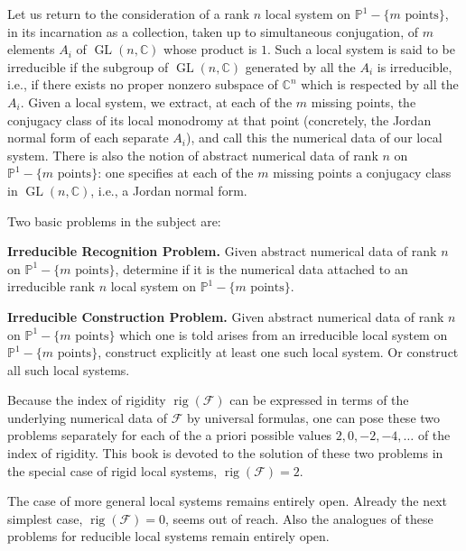 Let us return to the consideration of a rank \(n\) local system on
\(\mathbb{P}^1-\{m\text{ points}\}\), in its incarnation as a collection,
taken up to simultaneous conjugation, of \(m\) elements \(A_i\) of
\(\operatorname{GL}(n,\mathbb{C})\) whose product is \(1\). Such a local
system is said to be irreducible if the subgroup of
\(\operatorname{GL}(n,\mathbb{C})\) generated by all the \(A_i\) is
irreducible, i.e., if there exists no proper nonzero subspace of
\(\mathbb{C}^n\) which is respected by all the \(A_i\). Given a local
system, we extract, at each of the \(m\) missing points, the conjugacy class
of its local monodromy at that point (concretely, the Jordan normal form
of each separate \(A_i\)), and call this the numerical data of our local
system. There is also the notion of abstract numerical data of rank \(n\)
on \(\mathbb{P}^1-\{m\text{ points}\}\): one specifies at each of the
\(m\) missing points a conjugacy class in
\(\operatorname{GL}(n,\mathbb{C})\), i.e., a Jordan normal form.

Two basic problems in the subject are:

\noindent\textbf{Irreducible Recognition Problem.}\quad
Given abstract numerical data of rank \(n\) on
\(\mathbb{P}^1-\{m\text{ points}\}\), determine if it is the numerical
data attached to an irreducible rank \(n\) local system on
\(\mathbb{P}^1-\{m\text{ points}\}\).

\noindent\textbf{Irreducible Construction Problem.}\quad
Given abstract numerical data of rank \(n\) on
\(\mathbb{P}^1-\{m\text{ points}\}\) which one is told arises from an
irreducible local system on \(\mathbb{P}^1-\{m\text{ points}\}\), construct
explicitly at least one such local system. Or construct all such local
systems.

Because the index of rigidity \(\operatorname{rig}(\mathcal{F})\) can be
expressed in terms of the underlying numerical data of \(\mathcal{F}\) by
universal formulas, one can pose these two problems separately for each of
the a priori possible values \(2,0,-2,-4,\ldots\) of the index of rigidity.
This book is devoted to the solution of these two problems in the special
case of rigid local systems, \(\operatorname{rig}(\mathcal{F})=2\).

The case of more general local systems remains entirely open. Already the
next simplest case, \(\operatorname{rig}(\mathcal{F})=0\), seems out of
reach. Also the analogues of these problems for reducible local systems
remain entirely open.

